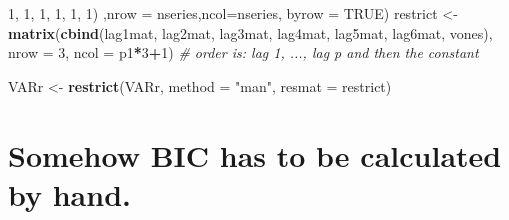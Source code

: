 \documentclass[]{article}
\newenvironment{Shaded}{\begin{snugshade}}{\end{snugshade}}
\newcommand{\KeywordTok}[1]{\textcolor[rgb]{0.13,0.29,0.53}{\textbf{#1}}}
\newcommand{\DataTypeTok}[1]{\textcolor[rgb]{0.13,0.29,0.53}{#1}}
\newcommand{\DecValTok}[1]{\textcolor[rgb]{0.00,0.00,0.81}{#1}}
\newcommand{\StringTok}[1]{\textcolor[rgb]{0.31,0.60,0.02}{#1}}
\newcommand{\CommentTok}[1]{\textcolor[rgb]{0.56,0.35,0.01}{\textit{#1}}}
\newcommand{\OtherTok}[1]{\textcolor[rgb]{0.56,0.35,0.01}{#1}}
\newcommand{\OperatorTok}[1]{\textcolor[rgb]{0.81,0.36,0.00}{\textbf{#1}}}
\newcommand{\NormalTok}[1]{#1}
\begin{document}
\begin{Shaded}
\begin{Highlighting}[]
                    \DecValTok{1}\NormalTok{, }\DecValTok{1}\NormalTok{, }\DecValTok{1}\NormalTok{,}
                    \DecValTok{1}\NormalTok{, }\DecValTok{1}\NormalTok{, }\DecValTok{1}\NormalTok{)}
\NormalTok{                  ,}\DataTypeTok{nrow =}\NormalTok{ nseries,}\DataTypeTok{ncol=}\NormalTok{nseries, }\DataTypeTok{byrow =} \OtherTok{TRUE}\NormalTok{)}
\NormalTok{restrict <-}\StringTok{ }\KeywordTok{matrix}\NormalTok{(}\KeywordTok{cbind}\NormalTok{(lag1mat, lag2mat, lag3mat, lag4mat, lag5mat, lag6mat,  vones),}
           \DataTypeTok{nrow =} \DecValTok{3}\NormalTok{, }\DataTypeTok{ncol =}\NormalTok{ p1}\OperatorTok{*}\DecValTok{3}\OperatorTok{+}\DecValTok{1}\NormalTok{) }\CommentTok{# order is: lag 1, ..., lag p and then the constant}

\NormalTok{VARr     <-}\StringTok{ }\KeywordTok{restrict}\NormalTok{(VARr, }\DataTypeTok{method =} \StringTok{"man"}\NormalTok{, }\DataTypeTok{resmat =}\NormalTok{ restrict)}
\end{Highlighting}
\end{Shaded}

\section{Somehow BIC has to be calculated by
hand.}\label{somehow-bic-has-to-be-calculated-by-hand.}

\begin{Shaded}
\end{Shaded}
\end{document}
